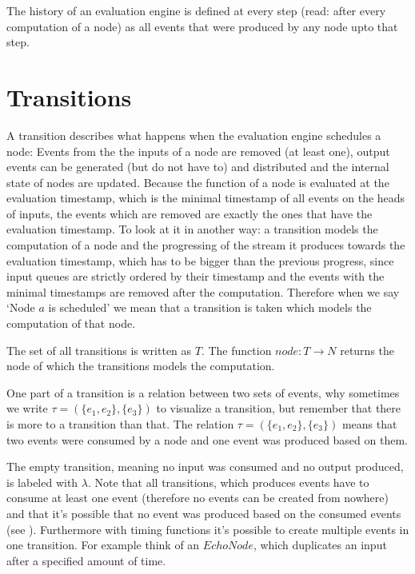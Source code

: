 The history of an evaluation engine is defined at every step (read: after every computation of a node) as all events that were produced by any node upto that step.

\section{Transitions}
\label{sec:definitions:transitions}

A transition describes what happens when the evaluation engine schedules a node:
Events from the the inputs of a node are removed (at least one), output events can be generated (but do not have to) and distributed and the internal state of nodes are updated.
Because the function of a node is evaluated at the evaluation timestamp, which is the minimal timestamp of all events on the heads of inputs, the events which are removed are exactly the ones that have the evaluation timestamp.
To look at it in another way: a transition models the computation of a node and the progressing of the stream it produces towards the evaluation timestamp, which has to be bigger than the previous progress, since input queues are strictly ordered by their timestamp and the events with the minimal timestamps are removed after the computation.
Therefore when we say `Node \(a\) is scheduled' we mean that a transition is taken which models the computation of that node.

The set of all transitions is written as \(T\).
The function \(\mathit{node} : T \rightarrow N\) returns the node of which the transitions models the computation.

One part of a transition is a relation between two sets of events, why sometimes we write \(\tau = (\{e_1, e_2\}, \{e_3\})\) to visualize a transition, but remember that there is more to a transition than that.
The relation \(\tau = (\{e_1,e_2\}, \{e_3\})\) means that two events were consumed by a node and one event was produced based on them.

The empty transition, meaning no input was consumed and no output produced, is labeled with \(\lambda\).
Note that all transitions, which produces events have to consume at least one event (therefore no events can be created from nowhere) and that it's possible that no event was produced based on the consumed events (see ).
Furthermore with timing functions it's possible to create multiple events in one transition.
For example think of an \(\mathit{EchoNode}\), which duplicates an input after a specified amount of time.
\clearpage


